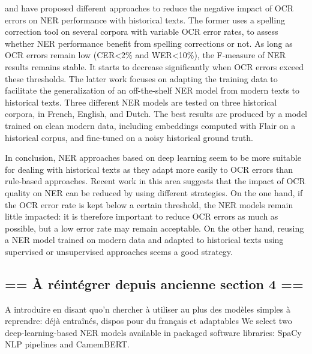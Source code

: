 \cite{huynh2020use} and \cite{marz2021data} have proposed different approaches to reduce the negative impact of OCR errors on NER performance with historical texts.
The former uses a spelling correction tool on several corpora with variable OCR error rates, to assess whether NER performance benefit from spelling corrections or not.
As long as OCR errors remain low (CER<2\% and WER<10\%), the F-measure of NER results remains stable.
It starts to decrease significantly when OCR errors exceed these thresholds.
The latter work focuses on adapting the training data to facilitate the generalization of an off-the-shelf NER model from modern texts to historical texts.
Three different NER models are tested on three historical corpora, in French, English, and Dutch. The best results are produced by a model trained on clean modern data, including embeddings computed with Flair on a historical corpus, and fine-tuned on a noisy historical ground truth.

In conclusion, NER approaches based on deep learning seem to be more suitable for dealing with historical texts as they adapt more easily to OCR errors than rule-based approaches.
Recent work in this area suggests that the impact of OCR quality on NER can be reduced by using different strategies.
On the one hand, if the OCR error rate is kept below a certain threshold, the NER models remain little impacted: it is therefore important to reduce OCR errors as much as possible, but a low error rate may remain acceptable.
On the other hand, reusing a NER model trained on modern data and adapted to historical texts using supervised or unsupervised approaches seems a good strategy. 




\subsection{== À réintégrer depuis ancienne section 4 ==}

A introduire en disant quo'n chercher à utiliser au plus des modèles simples à reprendre: déjà entraînés, dispos pour du français et adaptables
We select two deep-learning-based NER models available in packaged software libraries: SpaCy NLP pipelines and CamemBERT.


